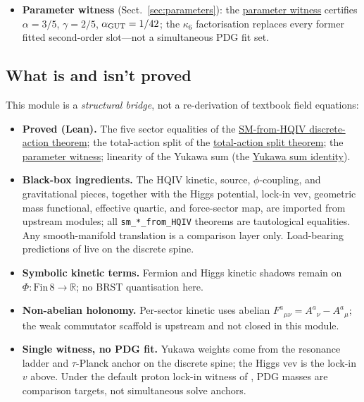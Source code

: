 \documentclass[11pt]{amsart}
\begin{document}
\begin{itemize}[leftmargin=2em]
  \hyperref[lean:headline]{SM-from-HQIV discrete-action theorem})
  certifies the five sector equalities simultaneously; the total-action
  equality (the
  \hyperref[lean:total-split]{total-action split theorem}) exhibits the
  SM gauge $+$ fermion $+$ $\phi$-coupling $+$ Friedmann split of the HQIV
  total cell when $J_{\rm src}=\sum_{\rm gen} J(\rm gen)$.
\item \textbf{Parameter witness} (Sect.~\ref{sec:parameters}):
  the \hyperref[lean:param-witness]{parameter witness} certifies
  $\alpha=3/5$, $\gamma=2/5$, $\alpha_{\rm GUT}=1/42$; the
  $\kappa_6$ factorisation replaces every former fitted second-order
  slot---not a simultaneous PDG fit set.
\end{itemize}

\subsection{What is and isn't proved}
\label{subsec:not-claimed}

This module is a \emph{structural bridge}, not a re-derivation of textbook
field equations:

\begin{itemize}[leftmargin=2em]
\item \textbf{Proved (Lean).} The five sector equalities of the
  \hyperref[lean:headline]{SM-from-HQIV discrete-action theorem}; the
  total-action split of the
  \hyperref[lean:total-split]{total-action split theorem}; the
  \hyperref[lean:param-witness]{parameter witness}; linearity of the
  Yukawa sum (the \hyperref[lean:yukawa-sum]{Yukawa sum identity}).
\item \textbf{Black-box ingredients.} The HQIV kinetic, source,
  $\phi$-coupling, and gravitational pieces, together with the Higgs
  potential, lock-in vev, geometric mass functional, effective quartic,
  and force-sector map, are imported from upstream modules; all
  \texttt{sm\_*\_from\_HQIV} theorems are tautological equalities.
  Any smooth-manifold translation is a comparison layer only. Load-bearing
  predictions of \cite{hqiv-oct-action-paper} live on the discrete spine.
\item \textbf{Symbolic kinetic terms.} Fermion and Higgs kinetic shadows
  remain on $\Phi:\mathrm{Fin}\,8\to\mathbb{R}$; no BRST quantisation here.
\item \textbf{Non-abelian holonomy.} Per-sector kinetic uses abelian
  $F^a{}_{\mu\nu}=A^a{}_\nu-A^a{}_\mu$; the weak commutator scaffold is
  upstream and not closed in this module.
\item \textbf{Single witness, no PDG fit.} Yukawa weights come from the
  resonance ladder and $\tau$-Planck anchor on the discrete spine; the Higgs
  vev is the lock-in $v$ above. Under the default proton lock-in witness of
  \cite{hqiv-tuft-dynamic-mass-spectrum-paper,hqiv-kirchhoff-paper}, PDG masses are
  comparison targets, not simultaneous solve anchors.
\end{itemize}
\end{document}
